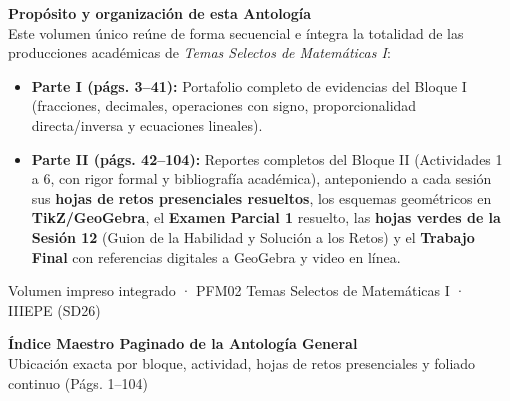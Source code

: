 \documentclass[spanish,letterpaper,oneside]{article}
\begin{document}
\vspace{0.55cm}
\noindent\colorbox{iiiepePale}{%
  \parbox{\dimexpr\textwidth-2\fboxsep\relax}{%
    \vspace{4pt}
    {\normalsize\bfseries\color{iiiepeNavy} Propósito y organización de esta Antología}\\[5pt]
    \small Este volumen único reúne de forma secuencial e íntegra la totalidad de las producciones académicas de \textit{Temas Selectos de Matemáticas I}:
    \begin{itemize}\setlength{\itemsep}{3pt}\setlength{\topsep}{3pt}
      \item \textbf{Parte I (págs. 3--41):} Portafolio completo de evidencias del Bloque I (fracciones, decimales, operaciones con signo, proporcionalidad directa/inversa y ecuaciones lineales).
      \item \textbf{Parte II (págs. 42--104):} Reportes completos del Bloque II (Actividades 1 a 6, con rigor formal y bibliografía académica), anteponiendo a cada sesión sus \textbf{hojas de retos presenciales resueltos}, los esquemas geométricos en \textbf{TikZ/GeoGebra}, el \textbf{Examen Parcial 1} resuelto, las \textbf{hojas verdes de la Sesión 12} (Guion de la Habilidad y Solución a los Retos) y el \textbf{Trabajo Final} con referencias digitales a GeoGebra y video en línea.
    \end{itemize}
    \vspace{2pt}
  }%
}

\vfill
\begin{center}
  {\footnotesize\color{iiiepeNavy} Volumen impreso integrado · PFM02 Temas Selectos de Matemáticas I · IIIEPE (SD26)}
\end{center}

\newpage
\begin{center}
  {\large\bfseries\color{iiiepeNavy} Índice Maestro Paginado de la Antología General}\\[2pt]
  {\footnotesize Ubicación exacta por bloque, actividad, hojas de retos presenciales y foliado continuo (Págs. 1--104)}
\end{center}
\vspace{2pt}
\end{document}
